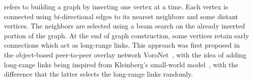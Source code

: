 
 refers to building a graph by inserting one vertex at a time. 
Each vertex is connected using bi-directional edges to its nearest neighbors and some distant vertices. The neighbors are selected using a beam search on the already inserted portion of the graph. At the end of graph construction, some vertices retain early connections which act as long-range links. 
This approach was first proposed in the object-based peer-to-peer overlay network VoroNet~\cite{voronet}, with the idea of adding long-range links being inspired from Kleinberg's small-world model~\cite{kleinberg2000, kleinberg2002}, with the difference that the latter selects the long-range links randomly. 


